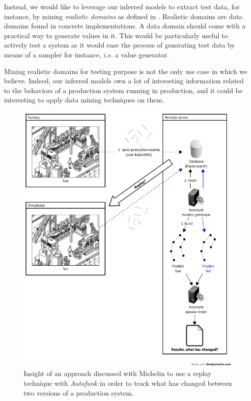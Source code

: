 Instead, we would like to leverage our inferred models to extract
test data, for instance, by mining \emph{realistic domains} as
defined in \cite{Enderlin:2011:PSL:2075545.2075551}. Realistic
domains are data domains found in concrete implementations. A
data domain should come with a practical way to generate values
in it. This would be particularly useful to actively test a
system as it would ease the process of generating test data by
means of a sampler for instance, \emph{i.e.} a value generator.

Mining realistic domains for testing purpose is not the only use
case in which we believe. Indeed, our inferred models own a lot
of interesting information related to the behaviors of a
production system running in production, and it could be
interesting to apply data mining techniques on them.\\

\begin{figure}[h]
    \begin{center}
        \includegraphics[width=0.96\linewidth]{figures/autofunk_active.png}
    \end{center}

    \caption{Insight of an approach discussed with Michelin to
    use a replay technique with \textit{Autofunk} in order to
    track what has changed between two versions of a production
    system.}
    \label{fig:autofunk_active}
\end{figure}

